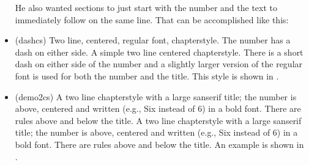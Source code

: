 \begin{itemize}
    He also wanted sections to just start with the number and the text to 
immediately follow on the same line. That can be accomplished like this:
\begin{lcode}
\renewcommand*{\thesection}{\arabic{section}}
\renewcommand*{\section}[1]{%
  \refstepcounter{section}%
  \par\noindent
  \textbf{\thesection.}%
  \space\nolinebreak}
\end{lcode}

\item[\cstyle{dash}]
\glossary(dashcs)%
  {}%
  {Two line, centered, regular font, chapterstyle. The number has a dash on 
   either side.}
 A simple two line centered chapterstyle. There is a short
dash on either side of the number and a slightly larger
version of the regular font is used for both the number and the title.
This style is shown in .



\item[\cstyle{demo2}]
\glossary(demo2cs)%
  {}%
  {A two line chapterstyle with a large sanserif title; the number is above, 
   centered and written (e.g., Six instead of 6) in a bold font. 
   There are rules above and below the title.}
   A two line chapterstyle with a large sanserif title; the number is above, 
   centered and written (e.g., Six instead of 6) in a bold font. 
   There are rules above and below the title. An example is shown in 
  .




\end{itemize}
